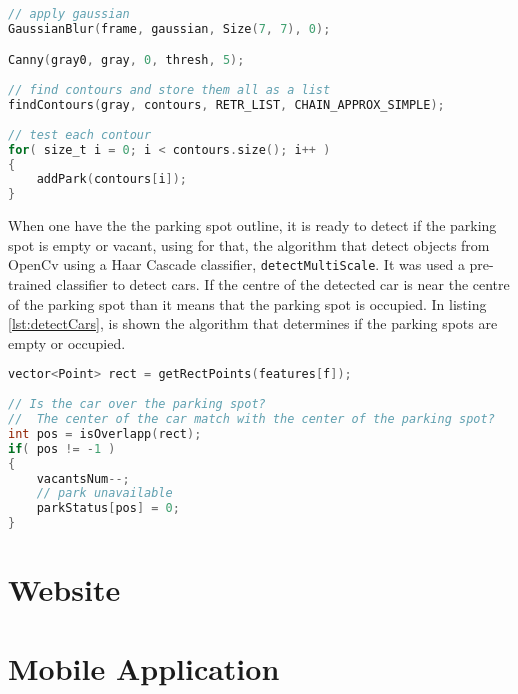\begin{lstlisting}[language=C, caption={Parking Spots Detection.}, label={lst:getOutline}]
// apply gaussian
GaussianBlur(frame, gaussian, Size(7, 7), 0);

Canny(gray0, gray, 0, thresh, 5);
		
// find contours and store them all as a list
findContours(gray, contours, RETR_LIST, CHAIN_APPROX_SIMPLE);
	
// test each contour
for( size_t i = 0; i < contours.size(); i++ )
{
	addPark(contours[i]);
}
\end{lstlisting}

When one have the the parking spot outline, it is ready to detect if the parking spot is empty or vacant, using for that, the algorithm that detect objects from OpenCv using a Haar Cascade classifier, \verb|detectMultiScale|. It was used a pre-trained classifier to detect cars. If the centre of the detected car is near the centre of the parking spot than it means that the parking spot is occupied. In listing \ref{lst:detectCars}, is shown the algorithm that determines if the parking spots are empty or occupied. 

\begin{lstlisting}[language=C, caption={Empty Parking Spots Detection.}, label={lst:detectCars}]
vector<Point> rect = getRectPoints(features[f]);
	
// Is the car over the parking spot?
//  The center of the car match with the center of the parking spot?
int pos = isOverlapp(rect);
if( pos != -1 )
{
	vacantsNum--;
	// park unavailable
	parkStatus[pos] = 0;
}
\end{lstlisting}

\section{Website}

\section{Mobile Application}

